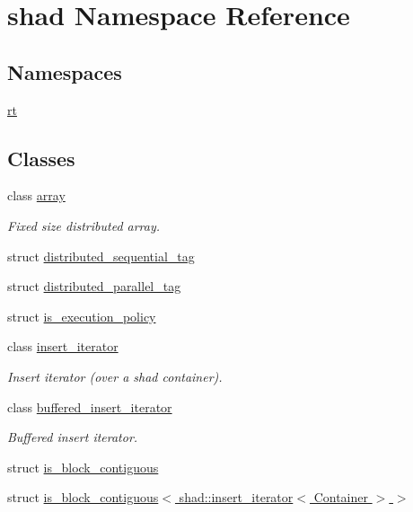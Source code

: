 \hypertarget{namespaceshad}{\section{shad Namespace Reference}
\label{namespaceshad}
}
\subsection*{Namespaces}
\begin{DoxyCompactItemize}
\item 
\hyperlink{namespaceshad_1_1rt}{rt}
\end{DoxyCompactItemize}
\subsection*{Classes}
\begin{DoxyCompactItemize}
\item 
class \hyperlink{classshad_1_1array}{array}
\begin{DoxyCompactList}\small\item\em Fixed size distributed array. \end{DoxyCompactList}\item 
struct \hyperlink{structshad_1_1distributed__sequential__tag}{distributed\-\_\-sequential\-\_\-tag}
\item 
struct \hyperlink{structshad_1_1distributed__parallel__tag}{distributed\-\_\-parallel\-\_\-tag}
\item 
struct \hyperlink{structshad_1_1is__execution__policy}{is\-\_\-execution\-\_\-policy}
\item 
class \hyperlink{classshad_1_1insert__iterator}{insert\-\_\-iterator}
\begin{DoxyCompactList}\small\item\em Insert iterator (over a shad container). \end{DoxyCompactList}\item 
class \hyperlink{classshad_1_1buffered__insert__iterator}{buffered\-\_\-insert\-\_\-iterator}
\begin{DoxyCompactList}\small\item\em Buffered insert iterator. \end{DoxyCompactList}\item 
struct \hyperlink{structshad_1_1is__block__contiguous}{is\-\_\-block\-\_\-contiguous}
\item 
struct \hyperlink{structshad_1_1is__block__contiguous_3_01shad_1_1insert__iterator_3_01Container_01_4_01_4}{is\-\_\-block\-\_\-contiguous$<$ shad\-::insert\-\_\-iterator$<$ Container $>$ $>$}

\end{DoxyCompactItemize}

